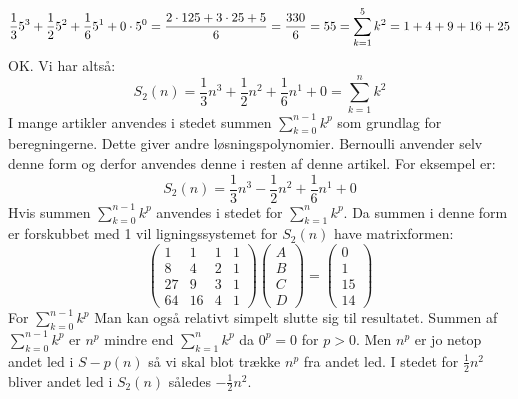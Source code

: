 \[\frac{1}{3} 5^3+\frac{1}{2}5^2+\frac{1}{6}5^1+0 \cdot 5^0\\
=\frac{2 \cdot 125+3 \cdot 25+5}{6}=\frac{330}{6}=55=\sum_{k=1}^{5}k^2=1+4+9+16+25\]
OK. 
Vi har altså:
\[S_{2}(n)=\frac{1}{3}n^3+\frac{1}{2}n^2+\frac{1}{6}n^1+0=\sum_{k=1}^{n}k^2\]	
I mange artikler anvendes i stedet summen \(\sum_{k=0}^{n-1}k^p\) som grundlag for beregningerne. Dette giver andre løsningspolynomier. Bernoulli anvender selv denne form og derfor anvendes denne i resten af denne artikel. For eksempel er:
\[S_{2}(n)=\frac{1}{3}n^3-\frac{1}{2}n^2+\frac{1}{6}n^1+0\]
Hvis summen \(\sum_{k=0}^{n-1}k^p\) anvendes i stedet for \(\sum_{k=1}^{n}k^p\).
Da summen i denne form er forskubbet med 1 vil ligningssystemet for \(S_{2}(n)\) have matrixformen:
\begin{equation} 
\begin{pmatrix}
1&1&1&1\\
8&4&2&1\\
27&9&3&1\\
64&16&4&1
\end{pmatrix}
\begin{pmatrix} A\\ B \\C \\ D \end{pmatrix}=\begin{pmatrix} 0\\1\\15\\14 \end{pmatrix}
\end{equation}
For \(\sum_{k=0}^{n-1}k^p\)
Man kan også relativt simpelt slutte sig til resultatet. Summen af \(\sum_{k=0}^{n-1}k^p\) er \(n^p\) mindre end \(\sum_{k=1}^{n}k^p\) da \(0^p=0\) for \(p>0\). Men \(n^p\)  er jo netop andet led i \(S-{p}(n)\) så vi skal blot trække \(n^p\) fra andet led. 
I stedet for \(\frac{1}{2}n^2\) bliver andet led i \(S_{2}(n)\) således \(-\frac{1}{2}n^2\).
